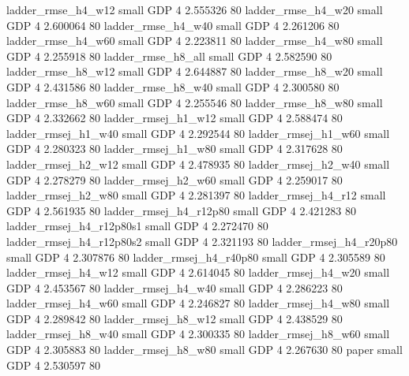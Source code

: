       ladder_rmse_h4_w12      small      GDP                 4 2.555326 80
      ladder_rmse_h4_w20      small      GDP                 4 2.600064 80
      ladder_rmse_h4_w40      small      GDP                 4 2.261206 80
      ladder_rmse_h4_w60      small      GDP                 4 2.223811 80
      ladder_rmse_h4_w80      small      GDP                 4 2.255918 80
      ladder_rmse_h8_all      small      GDP                 4 2.582590 80
      ladder_rmse_h8_w12      small      GDP                 4 2.644887 80
      ladder_rmse_h8_w20      small      GDP                 4 2.431586 80
      ladder_rmse_h8_w40      small      GDP                 4 2.300580 80
      ladder_rmse_h8_w60      small      GDP                 4 2.255546 80
      ladder_rmse_h8_w80      small      GDP                 4 2.332662 80
     ladder_rmsej_h1_w12      small      GDP                 4 2.588474 80
     ladder_rmsej_h1_w40      small      GDP                 4 2.292544 80
     ladder_rmsej_h1_w60      small      GDP                 4 2.280323 80
     ladder_rmsej_h1_w80      small      GDP                 4 2.317628 80
     ladder_rmsej_h2_w12      small      GDP                 4 2.478935 80
     ladder_rmsej_h2_w40      small      GDP                 4 2.278279 80
     ladder_rmsej_h2_w60      small      GDP                 4 2.259017 80
     ladder_rmsej_h2_w80      small      GDP                 4 2.281397 80
     ladder_rmsej_h4_r12      small      GDP                 4 2.561935 80
  ladder_rmsej_h4_r12p80      small      GDP                 4 2.421283 80
ladder_rmsej_h4_r12p80s1      small      GDP                 4 2.272470 80
ladder_rmsej_h4_r12p80s2      small      GDP                 4 2.321193 80
  ladder_rmsej_h4_r20p80      small      GDP                 4 2.307876 80
  ladder_rmsej_h4_r40p80      small      GDP                 4 2.305589 80
     ladder_rmsej_h4_w12      small      GDP                 4 2.614045 80
     ladder_rmsej_h4_w20      small      GDP                 4 2.453567 80
     ladder_rmsej_h4_w40      small      GDP                 4 2.286223 80
     ladder_rmsej_h4_w60      small      GDP                 4 2.246827 80
     ladder_rmsej_h4_w80      small      GDP                 4 2.289842 80
     ladder_rmsej_h8_w12      small      GDP                 4 2.438529 80
     ladder_rmsej_h8_w40      small      GDP                 4 2.300335 80
     ladder_rmsej_h8_w60      small      GDP                 4 2.305883 80
     ladder_rmsej_h8_w80      small      GDP                 4 2.267630 80
                   paper      small      GDP                 4 2.530597 80
